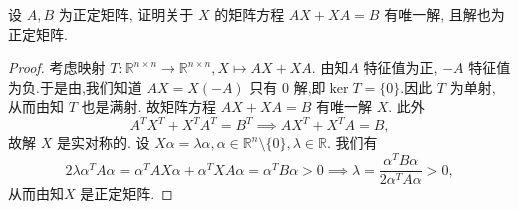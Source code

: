 \documentclass[../../main.tex]{subfiles}
\begin{document}
\begin{example}
设 \( A,B \) 为正定矩阵, 证明关于 \( X \) 的矩阵方程 \( AX + XA = B \) 有唯一解, 且解也为正定矩阵.
\end{example}
\begin{proof}
考虑映射 \( T: \mathbb{R}^{n \times n} \to \mathbb{R}^{n \times n}, X \mapsto AX + XA \). 由知\( A \) 特征值为正, \( -A \) 特征值为负.于是由,我们知道 \( AX = X(-A) \) 只有 0 解,即$\ker T=\{0\}$.因此 \( T \) 为单射, 从而由知 \( T \) 也是满射. 故矩阵方程 \( AX + XA = B \) 有唯一解 \( X \). 此外
\[
A^T X^T + X^T A^T = B^T \implies AX^T + X^T A = B,
\]
故解 \( X \) 是实对称的. 设 \( X\alpha = \lambda\alpha, \alpha \in \mathbb{R}^n \setminus \{0\}, \lambda \in \mathbb{R} \). 我们有
\[
2\lambda\alpha^T A\alpha = \alpha^T AX\alpha + \alpha^T XA\alpha = \alpha^T B\alpha > 0 \implies \lambda = \frac{\alpha^T B\alpha}{2\alpha^T A\alpha} > 0,
\]
从而由知\( X \) 是正定矩阵.
\end{proof}
\end{document}
